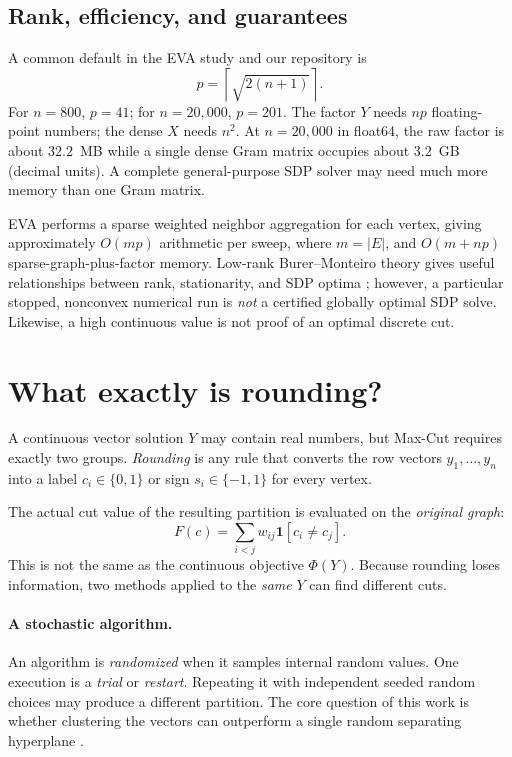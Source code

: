 \documentclass[10pt,letterpaper]{article}
\newcommand{\I}{\mathbf 1}
\begin{document}
\subsection{Rank, efficiency, and guarantees}
A common default in the EVA study and our repository is
\begin{equation}\label{eq:rank}
 p=\left\lceil\sqrt{2(n+1)}\right\rceil.
\end{equation}
For $n=800$, $p=41$; for $n=20{,}000$, $p=201$. The factor $Y$ needs $np$ floating-point numbers; the dense $X$ needs $n^2$. At $n=20{,}000$ in float64, the raw factor is about $32.2$~MB while a single dense Gram matrix occupies about $3.2$~GB (decimal units). A complete general-purpose SDP solver may need much more memory than one Gram matrix.

EVA performs a sparse weighted neighbor aggregation for each vertex, giving approximately $O(mp)$ arithmetic per sweep, where $m=|E|$, and $O(m+np)$ sparse-graph-plus-factor memory. Low-rank Burer--Monteiro theory gives useful relationships between rank, stationarity, and SDP optima \cite{eva2026,burer2003}; however, a particular stopped, nonconvex numerical run is \emph{not} a certified globally optimal SDP solve. Likewise, a high continuous value is not proof of an optimal discrete cut.

\section{What exactly is rounding?}
\label{sec:round}
A continuous vector solution $Y$ may contain real numbers, but Max-Cut requires exactly two groups. \emph{Rounding} is any rule that converts the row vectors $y_1,\ldots,y_n$ into a label $c_i\in\{0,1\}$ or sign $s_i\in\{-1,1\}$ for every vertex.

The actual cut value of the resulting partition is evaluated on the \emph{original graph}:
\begin{equation}\label{eq:rounded-score}
 F(c)=\sum_{i<j}w_{ij}\I[c_i\ne c_j].
\end{equation}
This is not the same as the continuous objective $\Phi(Y)$. Because rounding loses information, two methods applied to the \emph{same} $Y$ can find different cuts.

\paragraph{A stochastic algorithm.} An algorithm is \emph{randomized} when it samples internal random values. One execution is a \emph{trial} or \emph{restart}. Repeating it with independent seeded random choices may produce a different partition. The core question of this work is whether clustering the vectors can outperform a single random separating hyperplane \cite{rodriguez2020,thesis2021}.
\end{document}
